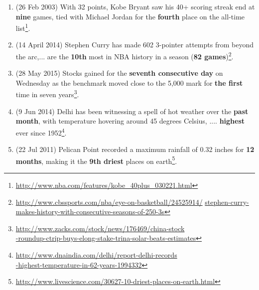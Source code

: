 \begin{enumerate}
\item{(26 Feb 2003) With 32 points, Kobe Bryant saw his 40+ scoring streak end at \textbf{nine} games, tied with Michael Jordan for the \textbf{fourth} place on the all-time list\footnote{\url{http://www.nba.com/features/kobe_40plus_030221.html}}.} 

\item{(14 April 2014) Stephen Curry has made 602 3-pointer attempts from beyond the arc,... are the \textbf{10th} most in NBA history in a season (\textbf{82 games})\footnote{\url{http://www.cbssports.com/nba/eye-on-basketball/24525914/} \url{stephen-curry-makes-history-with-consecutive-seasons-of-250-3s}}.}

\item{(28 May 2015) Stocks gained for the \textbf{seventh consecutive day} on Wednesday as the benchmark moved close to the 5,000 mark for \textbf{the first} time in seven years\footnote{\url{http://www.zacks.com/stock/news/176469/china-stock} \\ \url{-roundup-ctrip-buys-elong-stake-trina-solar-beats-estimates}}.}

\item{(9 Jun 2014) Delhi has been witnessing a spell of hot weather over the \textbf{past month}, with temperature hovering around 45 degrees Celsius, .... \textbf{highest} ever since 1952\footnote{\url{http://www.dnaindia.com/delhi/report-delhi-records} \\ \url{-highest-temperature-in-62-years-1994332}}.}

\item{(22 Jul 2011) Pelican Point recorded a maximum rainfall of 0.32 inches for \textbf{12 months}, making it the  \textbf{9th driest} places on earth\footnote{\url{http://www.livescience.com/30627-10-driest-places-on-earth.html}}.}
\end{enumerate}


